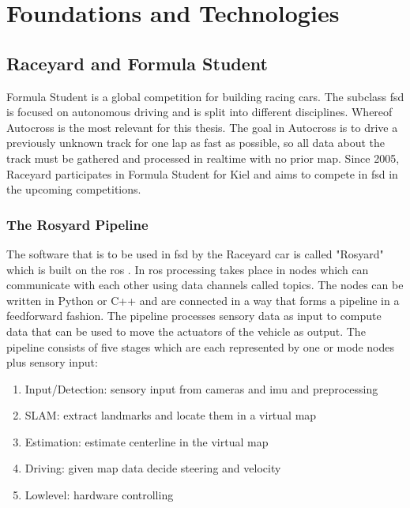 

\graphicspath{{Chapter/Figs/FoundationsAndTechnologies/}}
\chapter{Foundations and Technologies}

\section{Raceyard and Formula Student}
Formula Student is a global competition for building racing cars. The subclass \ac{fsd} is focused on autonomous driving and is split into different disciplines. Whereof Autocross is the most relevant for this thesis. The goal in Autocross is to drive a previously unknown track for one lap as fast as possible, so all data about the track must be gathered and processed in realtime with no prior map.
Since 2005, Raceyard participates in Formula Student for Kiel and aims to compete in \ac{fsd} in the upcoming competitions.


\subsection{The Rosyard Pipeline}
The software that is to be used in \ac{fsd} by the Raceyard car is called "Rosyard" which is built on the \ac{ros} \cite{ros}.
In \ac{ros} processing takes place in nodes which can communicate with each other using data channels called topics. The nodes can be written in Python or C++ and are connected in a way that forms a pipeline in a feedforward fashion. The pipeline processes sensory data as input to compute data that can be used to move the actuators of the vehicle as output. The pipeline consists of five stages which are each represented by one or mode nodes plus sensory input:
\begin{enumerate}
    \item Input/Detection: sensory input from cameras and \ac{imu} and preprocessing
    \item SLAM: extract landmarks and locate them in a virtual map
    \item Estimation: estimate centerline in the virtual map
    \item Driving: given map data decide steering and velocity
    \item Lowlevel: hardware controlling
\end{enumerate}


